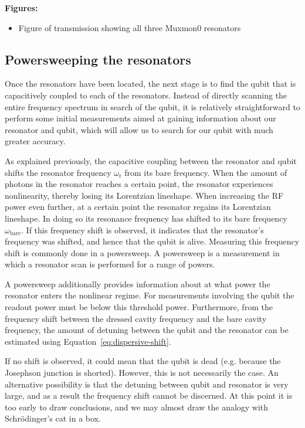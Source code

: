 \documentclass[12pt]{report}
\newcommand{\wbare}{\omega_\text{bare}}
\newcommand{\wres}{\omega_\text{r}}
\begin{document}
        \textbf{Figures:}
        \begin{itemize}
          \item Figure of transmission showing all three Muxmon0 resonators
        \end{itemize}

      \subsection{Powersweeping the resonators}
        Once the resonators have been located, the next stage is to find the qubit that is capacitively coupled to each of the resonators. Instead of directly scanning the entire frequency spectrum in search of the qubit, it is relatively straightforward to perform some initial measurements aimed at gaining information about our resonator and qubit, which will allow us to search for our qubit with much greater accuracy.

        As explained previously, the capacitive coupling between the resonator and qubit shifts the resonator frequency $\wres$ from its bare frequency. When the amount of photons in the resonator reaches a certain point, the resonator experiences nonlinearity, thereby losing its Lorentzian lineshape. When increasing the RF power even further, at a certain point the resonator regains its Lorentzian lineshape. In doing so its resonance frequency has shifted to its bare frequency $\wbare$. If this frequency shift is observed, it indicates that the resonator's frequency was shifted, and hence that the qubit is alive. Measuring this frequency shift is commonly done in a powersweep. A powersweep is a measurement in which a resonator scan is performed for a range of powers.

        A powersweep additionally provides information about at what power the resonator enters the nonlinear regime. For measurements involving the qubit the readout power must be below this threshold power. Furthermore, from the frequency shift between the dressed cavity frequency and the bare cavity frequency, the amount of detuning between the qubit and the resonator can be estimated using Equation~\ref{eq:dispersive-shift}.

        If no shift is observed, it could mean that the qubit is dead (e.g. because the Josephson junction is shorted). However, this is not necessarily the case. An alternative possibility is that the detuning between qubit and resonator is very large, and as a result the frequency shift cannot be discerned. At this point it is too early to draw conclusions, and we may almost draw the analogy with Schr\"odinger's cat in a box.
\end{document}
